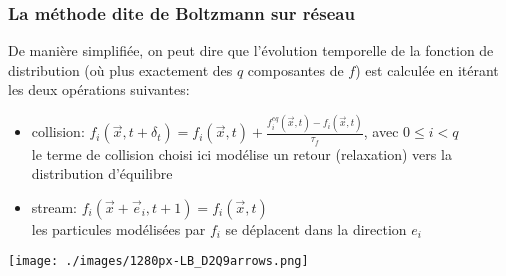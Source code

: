 \documentclass[utf8,usenames,dvipsnames,hyperref={pdfpagemode=FullScreen,urlcolor=blue}]{beamer}
\begin{document}
\begin{frame}
  \frametitle{La méthode dite de Boltzmann sur réseau}

  \begin{minipage}{0.66\linewidth}
    De manière simplifiée, on peut dire que l'évolution temporelle de la fonction de distribution (où plus exactement des $q$ composantes de $f$) est calculée en itérant les deux opérations suivantes:

    \begin{itemize}
    \item collision: $f_i(\vec{x},t+\delta_t) = f_i(\vec{x},t) + \frac{f_i^{eq}(\vec{x},t)-f_i(\vec{x},t)}{\tau_f}$, avec $ 0 \leq i < q$\\
      le terme de collision choisi ici modélise un retour (relaxation) vers la distribution d'équilibre 
    \item stream: $f_i(\vec{x}+\vec{e}_i,t+1) =f_i(\vec{x},t)$\\
      les particules modélisées par $f_{i}$ se déplacent dans la direction $e_{i}$
    \end{itemize}

  \end{minipage}
  \begin{minipage}{0.33\linewidth}
    \texttt{[image: ./images/1280px-LB\_D2Q9arrows.png]}
  \end{minipage}

\end{frame}
\end{document}
